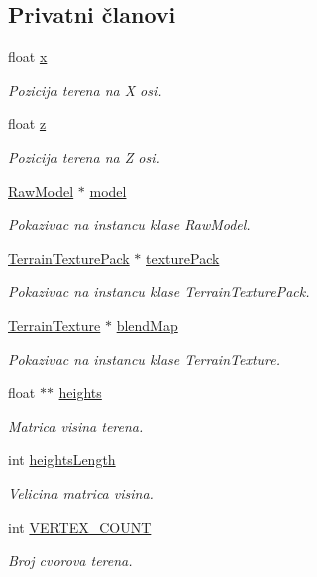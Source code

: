 \subsection*{Privatni članovi}
\begin{DoxyCompactItemize}
\item 
float \hyperlink{classterrain_1_1Terrain_aec56d6e8219539617090b8e99b89be29}{x}
\begin{DoxyCompactList}\small\item\em Pozicija terena na X osi. \end{DoxyCompactList}\item 
float \hyperlink{classterrain_1_1Terrain_aaa4c36ce01096f81a0ee174c36f19657}{z}
\begin{DoxyCompactList}\small\item\em Pozicija terena na Z osi. \end{DoxyCompactList}\item 
\hyperlink{classmodel_1_1RawModel}{Raw\+Model} $\ast$ \hyperlink{classterrain_1_1Terrain_a0811e4548a966a38b3ca6a4475666324}{model}
\begin{DoxyCompactList}\small\item\em Pokazivac na instancu klase Raw\+Model. \end{DoxyCompactList}\item 
\hyperlink{classtexture_1_1TerrainTexturePack}{Terrain\+Texture\+Pack} $\ast$ \hyperlink{classterrain_1_1Terrain_a6f9e86bd4c98ec61c9588b9f2b57fb75}{texture\+Pack}
\begin{DoxyCompactList}\small\item\em Pokazivac na instancu klase Terrain\+Texture\+Pack. \end{DoxyCompactList}\item 
\hyperlink{classtexture_1_1TerrainTexture}{Terrain\+Texture} $\ast$ \hyperlink{classterrain_1_1Terrain_a48d20417020f61e62bb5d3a497c62a57}{blend\+Map}
\begin{DoxyCompactList}\small\item\em Pokazivac na instancu klase Terrain\+Texture. \end{DoxyCompactList}\item 
float $\ast$$\ast$ \hyperlink{classterrain_1_1Terrain_a068874d68315a2dafb59630e6d9410f1}{heights}
\begin{DoxyCompactList}\small\item\em Matrica visina terena. \end{DoxyCompactList}\item 
int \hyperlink{classterrain_1_1Terrain_a797e69c6650b5870643574625f853718}{heights\+Length}
\begin{DoxyCompactList}\small\item\em Velicina matrica visina. \end{DoxyCompactList}\item 
int \hyperlink{classterrain_1_1Terrain_a27ca93bfb1ba44b0ff2935d667614f71}{V\+E\+R\+T\+E\+X\+\_\+\+C\+O\+U\+NT}
\begin{DoxyCompactList}\small\item\em Broj cvorova terena. \end{DoxyCompactList}\end{DoxyCompactItemize}


